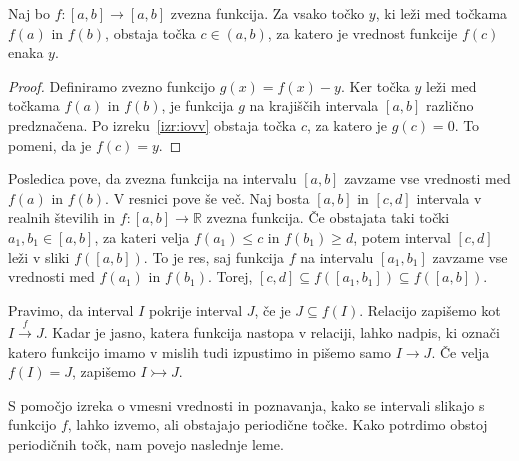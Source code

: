 \documentclass[mat2]{fmfdelo}
\newcommand{\R}{\mathbb R}
\begin{document}
\begin{posledica}\label{pos:vmesnavrednost}
Naj bo $f : [a, b] \to [a, b]$ zvezna funkcija. Za vsako točko $y$, ki leži med točkama $f(a)$ in $f(b)$, obstaja točka $c \in (a, b)$, za katero je vrednost funkcije $f(c)$ enaka $y$.
\end{posledica}
\begin{proof}
Definiramo zvezno funkcijo $g(x) = f(x) - y$. Ker točka $y$ leži med točkama $f(a)$ in $f(b)$, je funkcija $g$ na krajiščih intervala $[a, b]$ različno predznačena. Po izreku~\ref{izr:iovv} obstaja točka $c$, za katero je $g(c) = 0$. To pomeni, da je $f(c) = y$.
\end{proof}
Posledica pove, da zvezna funkcija na intervalu $[a, b]$ zavzame vse vrednosti med $f(a)$ in $f(b)$. V resnici pove še več. Naj bosta $[a, b]$ in $[c, d]$ intervala v realnih številih in $f : [a, b] \to \R$ zvezna funkcija. Če obstajata taki točki $a_1, b_1 \in [a, b]$, za kateri velja $f(a_1) \leq c$ in $f(b_1) \geq d$, potem interval $[c, d]$ leži v sliki $f([a, b])$. To je res, saj funkcija $f$ na intervalu $[a_1, b_1]$ zavzame vse vrednosti med $f(a_1)$ in $f(b_1)$. Torej, $[c, d] \subseteq f([a_1, b_1]) \subseteq f([a, b])$.

\begin{definicija}\label{def:pokritja}
Pravimo, da interval $I$ pokrije interval $J$, če je $J \subseteq f(I)$. Relacijo zapišemo kot $I \xrightarrow{f} J$. Kadar je jasno, katera funkcija nastopa v relaciji, lahko nadpis, ki označi katero funkcijo imamo v mislih tudi izpustimo in pišemo samo $I \to J$. Če velja $f(I) =J$, zapišemo $I \rightarrowtail J$.
\end{definicija}
S pomočjo izreka o vmesni vrednosti in poznavanja, kako se intervali slikajo s funkcijo $f$, lahko izvemo, ali obstajajo periodične točke. Kako potrdimo obstoj periodičnih točk, nam povejo naslednje leme.
\end{document}
